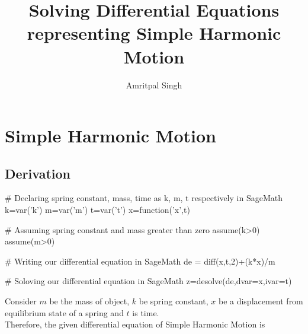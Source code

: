 \documentclass{report}
\title{Solving Differential Equations representing Simple Harmonic Motion}
\author{Amritpal Singh}
\begin{document}
\begin{titlepage}
\maketitle

\tableofcontents
\end{titlepage}

\chapter{Simple Harmonic Motion}
\section{Derivation}

\begin{sagesilent}
# Declaring spring constant, mass, time as k, m, t respectively in SageMath
k=var('k')
m=var('m')
t=var('t')
x=function('x',t)

# Assuming spring constant and mass greater than zero
assume(k>0)
assume(m>0)

# Writing our differential equation in SageMath
de = diff(x,t,2)+(k*x)/m

# Soloving our differential equation in SageMath
z=desolve(de,dvar=x,ivar=t)
\end{sagesilent}

Consider $m$ be the mass of object, $k$ be spring constant, $x$ be a displacement from equilibrium state of a spring and $t$ is time.\\
Therefore, the given differential equation of Simple Harmonic Motion is  
\end{document}
